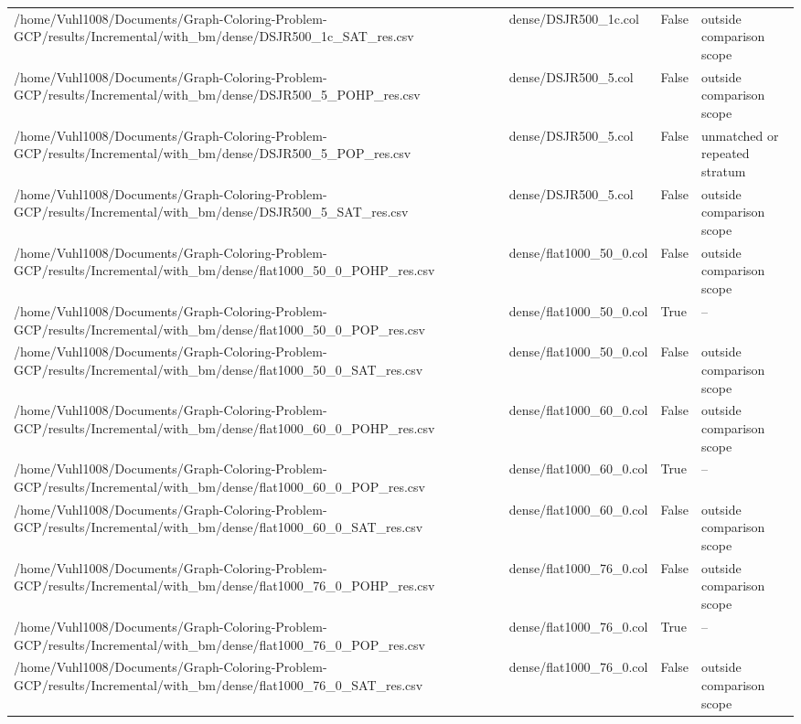 \begin{table}[htbp]
\begin{tabular}{llll}
/home/Vuhl1008/Documents/Graph-Coloring-Problem-GCP/results/Incremental/with\_bm/dense/DSJR500\_1c\_SAT\_res.csv & dense/DSJR500\_1c.col & False & outside comparison scope \\
/home/Vuhl1008/Documents/Graph-Coloring-Problem-GCP/results/Incremental/with\_bm/dense/DSJR500\_5\_POHP\_res.csv & dense/DSJR500\_5.col & False & outside comparison scope \\
/home/Vuhl1008/Documents/Graph-Coloring-Problem-GCP/results/Incremental/with\_bm/dense/DSJR500\_5\_POP\_res.csv & dense/DSJR500\_5.col & False & unmatched or repeated stratum \\
/home/Vuhl1008/Documents/Graph-Coloring-Problem-GCP/results/Incremental/with\_bm/dense/DSJR500\_5\_SAT\_res.csv & dense/DSJR500\_5.col & False & outside comparison scope \\
/home/Vuhl1008/Documents/Graph-Coloring-Problem-GCP/results/Incremental/with\_bm/dense/flat1000\_50\_0\_POHP\_res.csv & dense/flat1000\_50\_0.col & False & outside comparison scope \\
/home/Vuhl1008/Documents/Graph-Coloring-Problem-GCP/results/Incremental/with\_bm/dense/flat1000\_50\_0\_POP\_res.csv & dense/flat1000\_50\_0.col & True & -- \\
/home/Vuhl1008/Documents/Graph-Coloring-Problem-GCP/results/Incremental/with\_bm/dense/flat1000\_50\_0\_SAT\_res.csv & dense/flat1000\_50\_0.col & False & outside comparison scope \\
/home/Vuhl1008/Documents/Graph-Coloring-Problem-GCP/results/Incremental/with\_bm/dense/flat1000\_60\_0\_POHP\_res.csv & dense/flat1000\_60\_0.col & False & outside comparison scope \\
/home/Vuhl1008/Documents/Graph-Coloring-Problem-GCP/results/Incremental/with\_bm/dense/flat1000\_60\_0\_POP\_res.csv & dense/flat1000\_60\_0.col & True & -- \\
/home/Vuhl1008/Documents/Graph-Coloring-Problem-GCP/results/Incremental/with\_bm/dense/flat1000\_60\_0\_SAT\_res.csv & dense/flat1000\_60\_0.col & False & outside comparison scope \\
/home/Vuhl1008/Documents/Graph-Coloring-Problem-GCP/results/Incremental/with\_bm/dense/flat1000\_76\_0\_POHP\_res.csv & dense/flat1000\_76\_0.col & False & outside comparison scope \\
/home/Vuhl1008/Documents/Graph-Coloring-Problem-GCP/results/Incremental/with\_bm/dense/flat1000\_76\_0\_POP\_res.csv & dense/flat1000\_76\_0.col & True & -- \\
/home/Vuhl1008/Documents/Graph-Coloring-Problem-GCP/results/Incremental/with\_bm/dense/flat1000\_76\_0\_SAT\_res.csv & dense/flat1000\_76\_0.col & False & outside comparison scope \\

\end{tabular}
\end{table}
